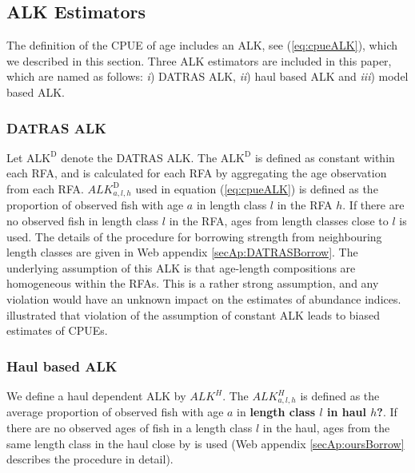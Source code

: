 \documentclass[a4paper 12pt]{article}
\numberwithin{equation}{section}
\begin{document}
 

\subsection{ALK Estimators}

The definition of the CPUE of age includes an ALK, see (\ref{eq:cpueALK}), which we described in this section. Three ALK estimators are included in this paper, which are named as follows:  \textit{i}) DATRAS ALK, \textit{ii}) haul based ALK and \textit{iii}) model based ALK.
\subsubsection{DATRAS ALK}
\label{sec:datrasalkestimator}
Let $\text{ALK}^{\text{D}}$ denote the DATRAS ALK. The $\text{ALK}^{\text{D}}$ is defined as constant within each RFA, and is calculated for each RFA by aggregating the age observation from each RFA. $ALK^{\text{D}}_{a,l,h}$ used in equation (\ref{eq:cpueALK}) is defined as the proportion of observed fish with age $a$ in length class $l$ in the RFA $h$. If there are no observed fish in length class $l$ in the RFA, ages from length classes close to $l$ is used. The details of the procedure for borrowing strength from neighbouring length classes are given in Web appendix \ref{secAp:DATRASBorrow}. The underlying assumption of this ALK  is that age-length compositions are homogeneous within the RFAs. This is a rather strong assumption, and any violation would have an unknown impact on the estimates of abundance indices. \citet{aanes2015efficient} illustrated that violation of the assumption of constant ALK leads to biased estimates of CPUEs. 

\subsubsection{Haul based ALK}
\label{sec:haulestimator}
We define a haul dependent ALK  by  $ALK^{H}$. The $ALK^{H}_{a,l,h}$ is defined as the average proportion of observed fish with age $a$ in {\bf length class $l$ in haul $h$?}. If there are no observed ages of fish in a length class $l$ in the haul, ages from the same length class in the haul close by is used (Web appendix \ref{secAp:oursBorrow} describes the procedure in detail).
\end{document}
